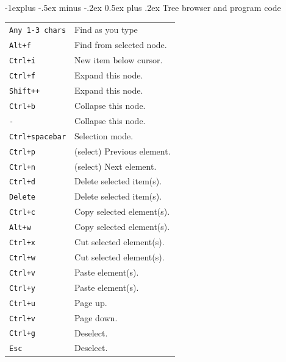 \documentclass[10pt,landscape]{article}
\makeatletter
\renewcommand{\subsection}{\@startsection{subsection}{2}{0mm}%
                                {-1explus -.5ex minus -.2ex}%
                                {0.5ex plus .2ex}%
                                {\normalfont\normalsize\bfseries}}
\makeatother
\begin{document}
\begin{multicols}{3}
\subsection{Tree browser and program code}
\newlength{\MyLen}
\begin{tabular}{@{}ll@{}}
\verb!Any 1-3 chars!    & Find as you type \\
\verb!Alt+f!  & Find from selected node. \\
\verb!Ctrl+i!    & New item below cursor. \\
\verb!Ctrl+f!  & Expand this node. \\
\verb!Shift++!  & Expand this node. \\
\verb!Ctrl+b!  & Collapse this node. \\
\verb!-!  & Collapse this node. \\
\verb!Ctrl+spacebar!  & Selection mode. \\
\verb!Ctrl+p!  & (select) Previous element. \\
\verb!Ctrl+n!  & (select) Next element. \\
\verb!Ctrl+d!  & Delete selected item(s). \\
\verb!Delete!  & Delete selected item(s). \\
\verb!Ctrl+c!  & Copy selected element(s). \\
\verb!Alt+w!  & Copy selected element(s). \\
\verb!Ctrl+x!  & Cut selected element(s). \\
\verb!Ctrl+w!  & Cut selected element(s). \\
\verb!Ctrl+v!  & Paste element(s). \\
\verb!Ctrl+y!  & Paste element(s). \\
\verb!Ctrl+u!  & Page up. \\
\verb!Ctrl+v!  & Page down. \\
\verb!Ctrl+g!  & Deselect. \\
\verb!Esc!  & Deselect.
\end{tabular}


\end{multicols}
\end{document}
